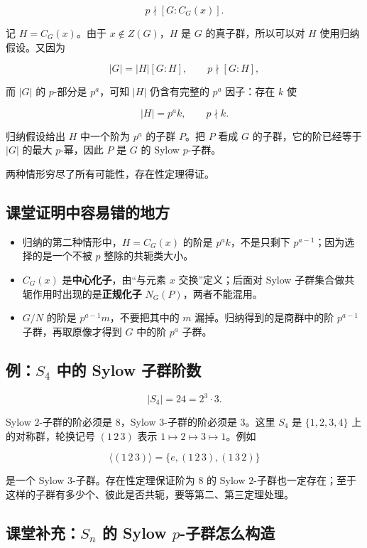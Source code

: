 \[
p\nmid [G:C_G(x)].
\]

记 $H=C_G(x)$。由于 $x\notin Z(G)$，$H$ 是 $G$ 的真子群，所以可以对 $H$ 使用归纳假设。又因为

\[
|G|=|H|[G:H],\qquad p\nmid [G:H],
\]

而 $|G|$ 的 $p$-部分是 $p^a$，可知 $|H|$ 仍含有完整的 $p^a$ 因子：存在 $k$ 使

\[
|H|=p^a k,\qquad p\nmid k.
\]

归纳假设给出 $H$ 中一个阶为 $p^a$ 的子群 $P$。把 $P$ 看成 $G$ 的子群，它的阶已经等于 $|G|$ 的最大 $p$-幂，因此 $P$ 是 $G$ 的 Sylow $p$-子群。

两种情形穷尽了所有可能性，存在性定理得证。

\subsection{课堂证明中容易错的地方}


\begin{itemize}
\item 归纳的第二种情形中，$H=C_G(x)$ 的阶是 $p^a k$，不是只剩下 $p^{a-1}$；因为选择的是一个不被 $p$ 整除的共轭类大小。
\item $C_G(x)$ 是\textbf{中心化子}，由“与元素 $x$ 交换”定义；后面对 Sylow 子群集合做共轭作用时出现的是\textbf{正规化子} $N_G(P)$，两者不能混用。
\item $G/N$ 的阶是 $p^{a-1}m$，不要把其中的 $m$ 漏掉。归纳得到的是商群中的阶 $p^{a-1}$ 子群，再取原像才得到 $G$ 中的阶 $p^a$ 子群。
\end{itemize}


\subsection{例：$S_4$ 中的 Sylow 子群阶数}


\[
|S_4|=24=2^3\cdot3.
\]

Sylow $2$-子群的阶必须是 $8$，Sylow $3$-子群的阶必须是 $3$。这里 $S_4$ 是 $\{1,2,3,4\}$ 上的对称群，轮换记号 $(1\,2\,3)$ 表示 $1\mapsto2\mapsto3\mapsto1$。例如

\[
\langle(1\,2\,3)\rangle=\{e,(1\,2\,3),(1\,3\,2)\}
\]

是一个 Sylow $3$-子群。存在性定理保证阶为 $8$ 的 Sylow $2$-子群也一定存在；至于这样的子群有多少个、彼此是否共轭，要等第二、第三定理处理。

\subsection{课堂补充：$S_n$ 的 Sylow $p$-子群怎么构造}


